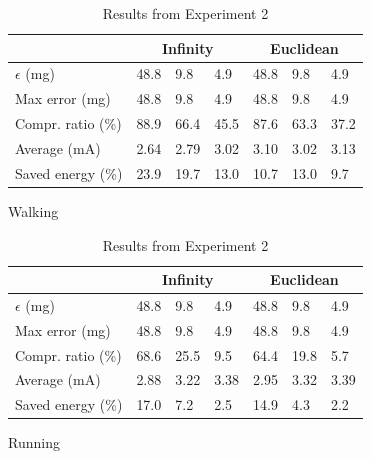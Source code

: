 \documentclass[10pt, conference, compsocconf]{IEEEtran}
\begin{document}
\begin{table}[]
   \begin{subfigure}{\columnwidth}
   \centering
   \begin{tabular}{l|l|l|l|l|l|l}
   \hline
   \rowcolor{headcolor}
                          & \multicolumn{3}{c|}{Infinity} & \multicolumn{3}{c}{Euclidean} \\\hline
   $\epsilon$ (mg)             & 48.8       & 9.8      & 4.9       & 48.8      & 9.8       & 4.9    \\
   Max error (mg)              & 48.8     & 9.8        & 4.9      & 48.8   & 9.8   & 4.9  \\
   Compr.      ratio (\%)      & 88.9    & 66.4  & 45.5   & 87.6   & 63.3   & 37.2 \\
   Average (mA)                & 2.64     & 2.79   & 3.02   & 3.10    & 3.02    & 3.13  \\
   Saved energy (\%)              & 23.9    & 19.7  & 13.0  &  10.7   & 13.0   & 9.7\\
   \hline
   \end{tabular}
   \caption{Walking}
   \end{subfigure}
   \begin{subfigure}{\columnwidth}
   \centering
   \begin{tabular}{l|l|l|l|l|l|l}
   \hline
   \rowcolor{headcolor}

                     & \multicolumn{3}{c|}{Infinity} & \multicolumn{3}{c}{Euclidean} \\\hline
   $\epsilon$ (mg)        & 48.8       & 9.8      & 4.9       & 48.8      & 9.8    & 4.9    \\
   Max error (mg)         & 48.8       & 9.8      & 4.9       & 48.8      & 9.8    & 4.9   \\
   Compr.      ratio (\%) & 68.6       & 25.5     & 9.5       & 64.4      & 19.8   & 5.7   \\
   Average (mA)        & 2.88     & 3.22   & 3.38     & 2.95    & 3.32    & 3.39   \\
   Saved energy (\%)      & 17.0    & 7.2    & 2.5   & 14.9   & 4.3   & 2.2\\
   \hline
   \end{tabular}
   \caption{Running}
   \end{subfigure}
   \caption{Results from Experiment 2}
   \label{table:results-energy}
\end{table}
\end{document}
